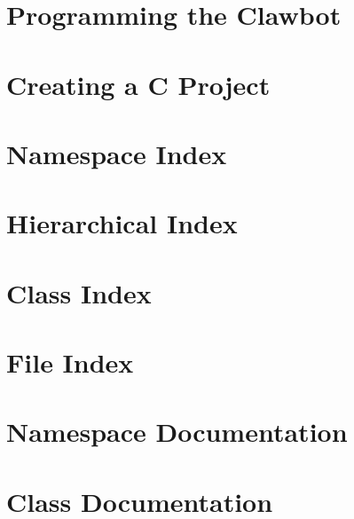 \documentclass[twoside]{book}
\newcommand{\+}{\discretionary{\mbox{\scriptsize$\hookleftarrow$}}{}{}}
\begin{document}
\chapter{Programming the Clawbot}
\label{md_docs_tutorials_walkthrough_clawbot}

\chapter{Creating a C Project}
\label{md_docs_tutorials_walkthrough_creating-c-project}

\chapter{Namespace Index}

\chapter{Hierarchical Index}

\chapter{Class Index}

\chapter{File Index}

\chapter{Namespace Documentation}






\chapter{Class Documentation}




















\end{document}
